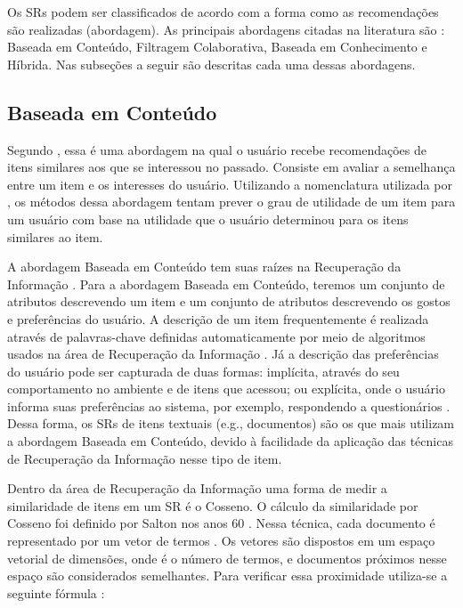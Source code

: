 Os SRs podem ser classificados de acordo com a forma como as recomendações são realizadas (abordagem). As principais
abordagens citadas na literatura são \cite{torres2004personalizaccao, adomavicius2005toward, ricci2011introduction}:
Baseada em Conteúdo, Filtragem Colaborativa, Baseada em Conhecimento e Híbrida. Nas subseções a seguir são descritas
cada uma dessas abordagens.

\subsection{Baseada em Conteúdo}\label{section:baseada-em-conteudo}

Segundo , essa é uma abordagem na qual o usuário recebe recomendações de itens
similares aos que se interessou no passado. Consiste em avaliar a semelhança entre um item e os interesses do usuário.
Utilizando a nomenclatura utilizada por , os métodos dessa abordagem tentam prever o
grau de utilidade de um item para um usuário com base na utilidade que o usuário determinou para os itens similares ao item.

A abordagem Baseada em Conteúdo tem suas raízes na Recuperação da Informação \cite{adomavicius2005toward}. Para a
abordagem Baseada em Conteúdo, teremos um conjunto de atributos descrevendo um item e um conjunto de atributos
descrevendo os gostos e preferências do usuário. A descrição de um item frequentemente é realizada através de
palavras-chave definidas automaticamente por meio de algoritmos usados na área de Recuperação da Informação
\cite{adomavicius2005toward}. Já a descrição das preferências do usuário pode ser capturada de duas formas: implícita,
através do seu comportamento no ambiente e de itens que acessou; ou explícita, onde o usuário informa suas preferências
ao sistema, por exemplo, respondendo a questionários \cite{adomavicius2005toward}. Dessa forma, os SRs de itens
textuais (e.g., documentos) são os que mais utilizam a abordagem Baseada em Conteúdo, devido à facilidade da aplicação
das técnicas de Recuperação da Informação nesse tipo de item.

Dentro da área de Recuperação da Informação uma forma de medir a similaridade de itens em um SR é o Cosseno. O cálculo
da similaridade por Cosseno foi definido por Salton nos anos 60 \cite{salton1964document}. Nessa técnica, cada documento
é representado por um vetor de termos . Os vetores são dispostos em um espaço vetorial de  dimensões, onde  é o número
de termos, e documentos próximos nesse espaço são considerados semelhantes. Para verificar essa proximidade utiliza-se a
seguinte fórmula \cite{christopher2008introduction}:

